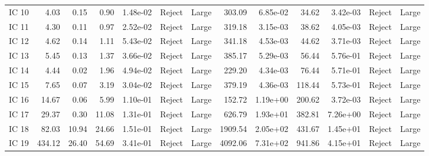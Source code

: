\begin{tabular}{lrrrrllrrrrll}
 IC 10 &               4.03 &   0.15 &                0.90 &  1.48e-02 &   Reject &       Large &                   303.09 &  6.85e-02 &                     34.62 &  3.42e-03 &  Reject &       Large \\
 IC 11 &               4.30 &   0.11 &                0.97 &  2.52e-02 &   Reject &       Large &                   319.18 &  3.15e-03 &                     38.62 &  4.05e-03 &  Reject &       Large \\
 IC 12 &               4.62 &   0.14 &                1.11 &  5.43e-02 &   Reject &       Large &                   341.18 &  4.53e-03 &                     44.62 &  3.71e-03 &  Reject &       Large \\
 IC 13 &               5.45 &   0.13 &                1.37 &  3.66e-02 &   Reject &       Large &                   385.17 &  5.29e-03 &                     56.44 &  5.76e-01 &  Reject &       Large \\
 IC 14 &               4.44 &   0.02 &                1.96 &  4.94e-02 &   Reject &       Large &                   229.20 &  4.34e-03 &                     76.44 &  5.71e-01 &  Reject &       Large \\
 IC 15 &               7.65 &   0.07 &                3.19 &  3.04e-02 &   Reject &       Large &                   379.19 &  4.36e-03 &                    118.44 &  5.73e-01 &  Reject &       Large \\
 IC 16 &              14.67 &   0.06 &                5.99 &  1.10e-01 &   Reject &       Large &                   152.72 &  1.19e+00 &                    200.62 &  3.72e-03 &  Reject &       Large \\
 IC 17 &              29.37 &   0.30 &               11.08 &  1.31e-01 &   Reject &       Large &                   626.79 &  1.93e+01 &                    382.81 &  7.26e+00 &  Reject &       Large \\
 IC 18 &              82.03 &  10.94 &               24.66 &  1.51e-01 &   Reject &       Large &                  1909.54 &  2.05e+02 &                    431.67 &  1.45e+01 &  Reject &       Large \\
 IC 19 &             434.12 &  26.40 &               54.69 &  3.41e-01 &   Reject &       Large &                  4092.06 &  7.31e+02 &                    941.86 &  4.15e+01 &  Reject &       Large \\
\bottomrule
\end{tabular}
